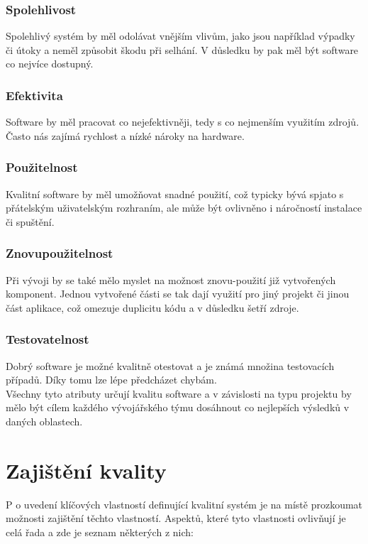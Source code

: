 		\subsubsection{Spolehlivost}
			Spolehlivý systém by měl odolávat vnějším vlivům, jako jsou například výpadky či útoky a neměl způsobit škodu při selhání. V důsledku by pak měl být software co nejvíce dostupný.
		
		\subsubsection{Efektivita}
			Software by měl pracovat co nejefektivněji, tedy s co nejmenším využitím zdrojů. Často nás zajímá rychlost a nízké nároky na hardware.
		
		\subsubsection{Použitelnost}
			Kvalitní software by měl umožňovat snadné použití, což typicky bývá spjato s přátelským uživatelským rozhraním, ale může být ovlivněno i náročností instalace či spuštění.
		
		\subsubsection{Znovupoužitelnost}
			Při vývoji by se také mělo myslet na možnost znovu-použití již vytvořených komponent. Jednou vytvořené části se tak dají využití pro jiný projekt či jinou část aplikace, což omezuje duplicitu kódu a v důsledku šetří zdroje.
		
		\subsubsection{Testovatelnost}
			Dobrý software je možné kvalitně otestovat a je známá množina testovacích případů. Díky tomu lze lépe předcházet chybám.\\

Všechny tyto atributy určují kvalitu software a v závislosti na typu projektu by mělo být cílem každého vývojářského týmu dosáhnout co nejlepších výsledků v daných oblastech. 


\section{Zajištění kvality}
P	o uvedení klíčových vlastností definující kvalitní systém je na místě prozkoumat možnosti zajištění těchto vlastností. Aspektů, které tyto vlastnosti ovlivňují je celá řada a zde je seznam některých z nich:


